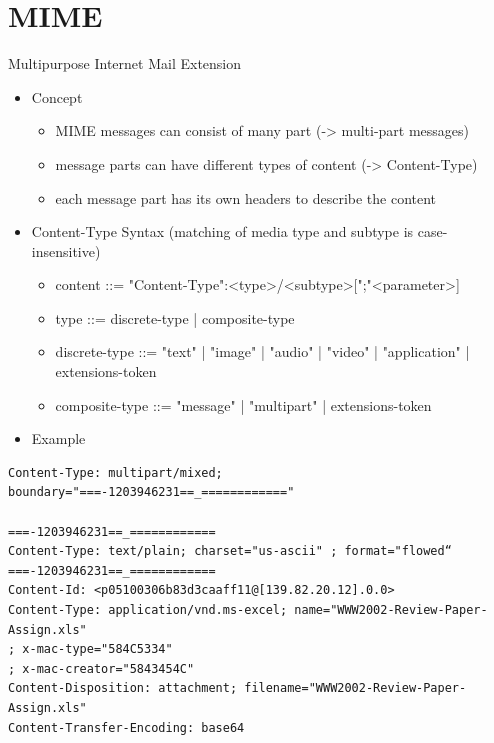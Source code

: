 \documentclass[11pt]{article}
\begin{document}
\section{MIME}
\label{sec:org5605ec8}
Multipurpose Internet Mail Extension
\begin{itemize}
\item Concept
\begin{itemize}
\item MIME messages can consist of many part (-> multi-part messages)
\item message parts can have different types of content (-> Content-Type)
\item each message part has its own headers to describe the content
\end{itemize}
\item Content-Type Syntax (matching of media type and subtype is case-insensitive)
\begin{itemize}
\item content ::= "Content-Type":<type>/<subtype>[";"<parameter>]
\item type ::= discrete-type | composite-type
\item discrete-type ::= "text" | "image" | "audio" | "video" | "application" | extensions-token
\item composite-type ::= "message" | "multipart" | extensions-token
\end{itemize}
\item Example
\end{itemize}
\begin{verbatim}
Content-Type: multipart/mixed; boundary="===-1203946231==_============"

===-1203946231==_============
Content-Type: text/plain; charset="us-ascii" ; format="flowed“
===-1203946231==_============
Content-Id: <p05100306b83d3caaff11@[139.82.20.12].0.0>
Content-Type: application/vnd.ms-excel; name="WWW2002-Review-Paper-Assign.xls"
; x-mac-type="584C5334"
; x-mac-creator="5843454C"
Content-Disposition: attachment; filename="WWW2002-Review-Paper-Assign.xls"
Content-Transfer-Encoding: base64
\end{verbatim}
\end{document}
